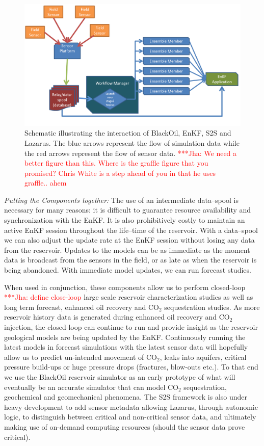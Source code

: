 \documentclass{rspublic}
\newcommand{\jhanote}[1]{ {\textcolor{red} { ***Jha: #1 }}}
\newcommand{\jhanote}[1]{}
\begin{document}
\begin{figure}
\begin{center}
 \includegraphics*[scale=0.33,angle=0]{figures/DetailedSensorFlow.png}
\end{center}
\caption{Schematic illustrating the interaction of BlackOil, EnKF, S2S
  and Lazarus. The blue arrows represent the flow of simulation data
  while the red arrows represent the flow of sensor data. \jhanote{We
    need a better figure than this. Where is the graffle figure that
    you promised? Chris White is a step ahead of you in that he uses
    graffle.. ahem}}
\label{fig:irregular_execution}
\end{figure}

{\it Putting the Components together: } The use of an intermediate
data--spool is necessary for many reasons: it is difficult to
guarantee resource availability and synchronization with the EnKF. It
is also prohibitively costly to maintain an active EnKF session
throughout the life--time of the reservoir. With a data--spool we can
also adjust the update rate at the EnKF session without losing any
data from the reservoir. Updates to the models can be as immediate as
the moment data is broadcast from the sensors in the field, or as late
as when the reservoir is being abandoned. With immediate model
updates, we can run forecast studies.

When used in conjunction, these components allow us to perform
closed-loop\jhanote{define close-loop} large scale reservoir
characterization studies as well as long term forecast, enhanced oil
recovery and CO$_2$ sequestration studies. As more reservoir history
data is generated during enhanced oil recovery and CO$_2$ injection,
the closed-loop can continue to run and provide insight as the
reservoir geological models are being updated by the EnKF.
Continuously running the latest models in forecast simulations with
the latest sensor data will hopefully allow us to predict un-intended
movement of CO$_2$, leaks into aquifers, critical pressure build-ups
or huge pressure drops (fractures, blow-outs etc.). To that end we use
the BlackOil reservoir simulator as an early prototype of what will
eventually be an accurate simulator that can model CO$_2$
sequestration, geochemical and geomechanical phenomena. The S2S
framework is also under heavy development to add sensor metadata
allowing Lazarus, through autonomic logic, to distinguish between
critical and non-critical sensor data, and ultimately making use of
on-demand computing resources (should the sensor data prove critical).
\end{document}
